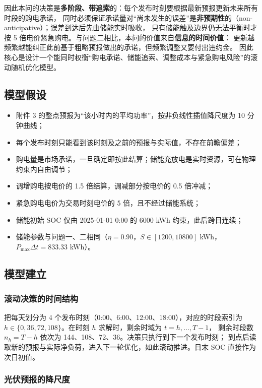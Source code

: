 \documentclass[12pt,a4paper]{article}
\begin{document}
因此本问的决策是\textbf{多阶段、带追索}的：每个发布时刻要根据最新预报更新未来所有时段的购电承诺，
同时必须保证承诺量对“尚未发生的误差”是\textbf{非预期性}的（non-anticipative）；误差到达后先由储能实时吸收，
只有储能触及边界仍无法平衡时才按 5 倍电价紧急购电。与问题二相比，本问的价值来自\textbf{信息的时间价值}：
更新越频繁越能纠正此前基于粗略预报做出的承诺，但频繁调整又要付出违约金。
因此核心是设计一个能同时权衡“购电承诺、储能追索、调整成本与紧急购电风险”的滚动随机优化模型。

\subsection{模型假设}

\begin{itemize}
    \item 附件 3 的整点预报为“该小时内的平均功率”，按非负线性插值降尺度为 10 分钟曲线；
    \item 每个发布时刻只能看到该时刻及之前的预报与实际值，不存在前瞻偏差；
    \item 购电量是市场承诺，一旦确定即按此结算；储能充放电是实时资源，可在物理约束内自由调节；
    \item 调增购电按电价的 1.5 倍结算，调减部分按电价的 0.5 倍冲减；
    \item 紧急购电电价为交易时刻电价的 5 倍，且不经过储能系统；
    \item 储能初始 SOC 仅由 2025-01-01 0:00 的 6000 kWh 约束，此后跨日连续；
    \item 储能参数与问题一、二相同（$\eta = 0.90$，$S \in [1200, 10800]$ kWh，$P_{\max}\Delta t = 833.33$ kWh）。
\end{itemize}

\subsection{模型建立}

\subsubsection{滚动决策的时间结构}

把每天划分为 4 个发布时刻（0:00、6:00、12:00、18:00），对应的时段索引为
$h \in \{0, 36, 72, 108\}$。在时刻 $h$ 求解时，剩余时域为 $t = h, \ldots, T-1$，
剩余时段数 $n_h = T - h$ 依次为 144、108、72、36。决策只执行到下一个发布时刻；
到点后读取新的预报与实际净负荷，进入下一轮优化，如此滚动推进。日末 SOC 直接作为次日初值。

\subsubsection{光伏预报的降尺度}
\end{document}
